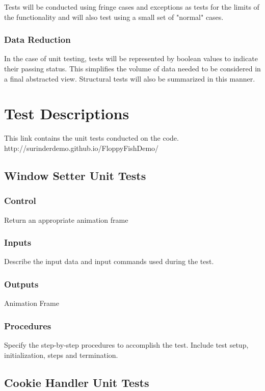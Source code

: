 \documentclass[11pt, oneside]{article}   	%
\begin{document}
Tests will be conducted using fringe cases and exceptions as tests for the limits of the functionality and will also test using a small set of "normal" cases.%

\subsubsection{Data Reduction}
In the case of unit testing, tests will be represented by boolean values to indicate their passing status. This simplifies the volume of data needed to be considered in a final abstracted view. Structural tests will also be summarized in this manner.



\section{Test Descriptions}
This link contains the unit tests conducted on the code.
http://surinderdemo.github.io/FloppyFishDemo/

\subsection{Window Setter Unit Tests}
\subsubsection{Control}
Return an appropriate animation frame

\subsubsection{Inputs}
Describe the input data and input commands used during the test.

\subsubsection{Outputs}
Animation Frame

\subsubsection{Procedures}
Specify the step-by-step procedures to accomplish the test. Include test setup, initialization, steps and termination.

\subsection{Cookie Handler Unit Tests}
\end{document}
